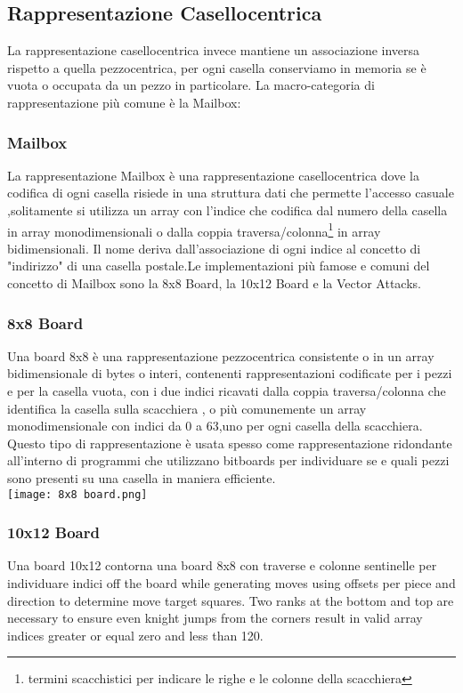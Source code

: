 \vfill
\clearpage


\subsection{Rappresentazione Casellocentrica}
La rappresentazione casellocentrica invece mantiene un associazione inversa rispetto a quella pezzocentrica,
per ogni casella conserviamo in memoria se è vuota o occupata da un pezzo in particolare.
La macro-categoria di  rappresentazione più comune è la Mailbox:

\subsubsection{Mailbox}
La rappresentazione Mailbox è una rappresentazione casellocentrica dove la codifica di ogni casella risiede in una struttura dati
che permette l'accesso casuale ,solitamente si utilizza un array con l'indice che codifica dal numero della casella in array monodimensionali
o dalla coppia traversa/colonna\footnote{termini scacchistici per indicare le righe e le colonne della scacchiera} in array bidimensionali.
Il nome deriva dall'associazione di ogni indice al concetto di "indirizzo" di una casella postale.Le implementazioni più famose e
comuni del concetto di Mailbox sono la 8x8 Board, la 10x12 Board e la Vector Attacks.

\subsubsection{8x8 Board}
Una board 8x8 è una rappresentazione pezzocentrica consistente o in un array bidimensionale di bytes o interi, contenenti rappresentazioni codificate
per i pezzi e per la casella vuota, con i due indici ricavati dalla coppia traversa/colonna che identifica la casella sulla scacchiera , 
o più comunemente un array monodimensionale con indici da 0 a 63,uno per ogni casella della scacchiera.
Questo tipo di rappresentazione è usata spesso come rappresentazione ridondante all'interno di programmi che utilizzano bitboards
per individuare se e quali pezzi sono presenti su una casella in maniera efficiente.\\
\texttt{[image: 8x8 board.png]}

\subsubsection{10x12 Board}
Una board 10x12  contorna una  board 8x8   con traverse e colonne sentinelle  per individuare  indici off the board while generating moves
using offsets per piece and direction to determine move target squares. Two ranks at the bottom and top are necessary to ensure even knight jumps
from the corners result in valid array indices greater or equal zero and less than 120.

